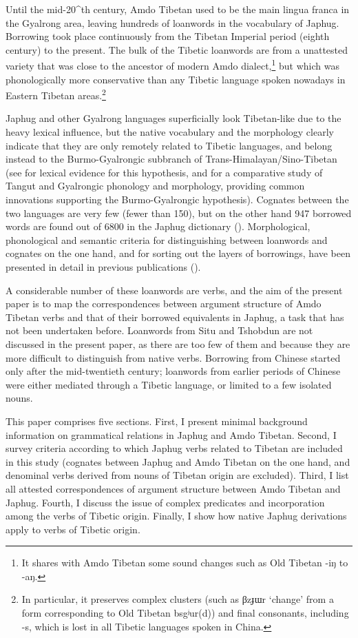 \documentclass[oldfontcommands,oneside,a4paper,11pt]{article}
\newcommand{\ipa}[1]{{\phon \mbox{#1}}} %
\begin{document}
Until the mid-20^{th} century, Amdo Tibetan used to be the main lingua franca in the Gyalrong area, leaving hundreds of loanwords in the vocabulary of Japhug. Borrowing took place continuously from the Tibetan Imperial period (eighth century) to the present. The bulk of the Tibetic loanwords are from a unattested variety that was close to the ancestor of modern Amdo dialect,\footnote{It shares with Amdo Tibetan some sound changes such as Old Tibetan \ipa{-iŋ} to \ipa{-aŋ}. } but which was phonologically more conservative than any Tibetic language spoken nowadays in Eastern Tibetan areas.\footnote{In particular, it preserves complex clusters (such as \ipa{βzɟɯr} `change' from a form corresponding to Old Tibetan \ipa{bsgʲur(d)}) and final consonants, including \ipa{-s}, which is lost in all Tibetic languages spoken in China.} 

Japhug and other Gyalrong languages superficially look Tibetan-like due to the heavy lexical influence, but the native vocabulary and the morphology clearly indicate that they are only remotely related to Tibetic languages, and belong instead to the Burmo-Gyalrongic subbranch of Trans-Himalayan/Sino-Tibetan (see \citealt{jacques.michaud11naish} for lexical evidence for this hypothesis, and \citealt{jacques14esquisse} for a comparative study of Tangut and Gyalrongic phonology and morphology, providing common innovations supporting the Burmo-Gyalrongic hypothesis). Cognates between the two languages are very few (fewer than 150), but on the other hand 947 borrowed words are found out of 6800 in the Japhug dictionary (\citealt{jacques15japhug}). Morphological, phonological and semantic criteria for distinguishing between loanwords and cognates on the one hand, and for sorting out the layers of borrowings, have been presented in detail in previous publications (\citealt[83-200]{jacques04these}). 

A considerable number of these loanwords are verbs, and the aim of the present paper is to map the correspondences between argument structure of Amdo Tibetan verbs and that of their borrowed equivalents in Japhug, a task that has not been undertaken before. Loanwords from Situ and Tshobdun are not discussed in the present paper, as there are too few of them and because they are more difficult to distinguish from native verbs. Borrowing from Chinese started only after the mid-twentieth century; loanwords from earlier periods of Chinese were either mediated through a Tibetic language, or limited to a few isolated nouns.

This paper comprises five sections. First, I present minimal background information on grammatical relations in Japhug and Amdo Tibetan. Second, I survey criteria according to which Japhug verbs related to Tibetan are included in this study (cognates between Japhug and Amdo Tibetan on the one hand, and denominal verbs derived from nouns of Tibetan origin are excluded). Third, I list all attested correspondences of argument structure between Amdo Tibetan and Japhug. Fourth, I discuss the issue of complex predicates and incorporation among the verbs of Tibetic origin. Finally, I show how native Japhug derivations apply to verbs of Tibetic origin.
\end{document}
